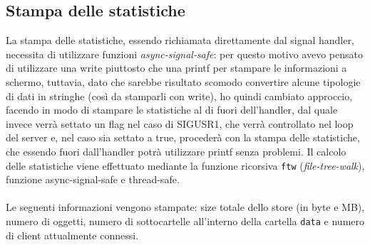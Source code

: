 \subsection{Stampa delle statistiche}
\begin{flushleft}

La stampa delle statistiche, essendo richiamata direttamente dal signal handler, necessita di utilizzare funzioni \emph{async-signal-safe}: per questo motivo avevo pensato di utilizzare una write piuttosto che una printf per stampare le informazioni a schermo, tuttavia, dato che sarebbe risultato scomodo convertire alcune tipologie di dati in stringhe (così da stamparli con write), ho quindi cambiato approccio, facendo in modo di stampare le statistiche al di fuori dell'handler, dal quale invece verrà settato un flag nel caso di SIGUSR1, che verrà controllato nel loop del server e, nel caso sia settato a true, procederà con la stampa delle statistiche, che essendo fuori dall'handler potrà utilizzare printf senza problemi.
Il calcolo delle statistiche viene effettuato mediante la funzione ricorsiva \texttt{ftw} (\emph{file-tree-walk}), funzione async-signal-safe e thread-safe.
\\~\\
Le seguenti informazioni vengono stampate: size totale dello store (in byte e MB), numero di oggetti, numero di sottocartelle all'interno della cartella \texttt{data} e numero di client attualmente connessi.  
\end{flushleft}

\newpage

